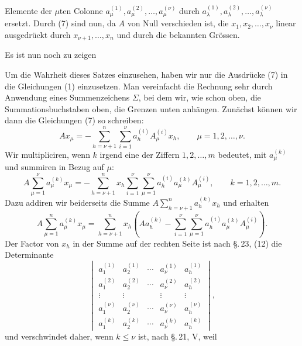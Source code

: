 
Elemente der $\mu$ten Colonne $a_\mu^{(1)},a_\mu^{(2)},\ldots,a_\mu^{(\nu)}$ durch $a_\lambda^{(1)},a_\lambda^{(2)},\ldots,a_\lambda^{(\nu)}$ ersetzt. Durch (7) sind nun, da $A$ von Null verschieden ist, die $x_1,x_2,\ldots,x_\nu$ linear ausgedrückt durch $x_{\nu+1},\ldots,x_n$ und durch die bekannten Grössen.

Es ist nun noch zu zeigen


Um die Wahrheit dieses Satzes einzusehen, haben wir nur die Ausdrücke (7) in die Gleichungen (1) einzusetzen. Man vereinfacht die Rechnung sehr durch Anwendung eines Summenzeichens \(\Sigma\), bei dem wir, wie schon oben, die Summationsbuchstaben oben, die Grenzen unten anhängen. Zunächst können wir dann die Gleichungen (7) so schreiben:
\begin{equation}
 A x_\mu=-\sum_{h=\nu+1}^{n}\sum_{i=1}^{\nu}a_h^{(i)}A_\mu^{(i)}x_h,
 \qquad \mu=1,2,\ldots,\nu.
\tag{9}
\end{equation}
Wir multipliciren, wenn $k$ irgend eine der Ziffern $1,2,\ldots,m$ bedeutet, mit $a_\mu^{(k)}$ und summiren in Bezug auf $\mu$:
\begin{equation}
 A\sum_{\mu=1}^{\nu}a_\mu^{(k)}x_\mu
 =-\sum_{h=\nu+1}^{n}x_h\sum_{i=1}^{\nu}\sum_{\mu=1}^{\nu}
 a_h^{(i)}a_\mu^{(k)}A_\mu^{(i)},
 \qquad k=1,2,\ldots,m.
\tag{10}
\end{equation}
Dazu addiren wir beiderseits die Summe $A\sum_{h=\nu+1}^{n}a_h^{(k)}x_h$ und erhalten
\begin{equation}
 A\sum_{\mu=1}^{n}a_\mu^{(k)}x_\mu
 =\sum_{h=\nu+1}^{n}x_h\left(Aa_h^{(k)}-
 \sum_{i=1}^{\nu}\sum_{\mu=1}^{\nu}a_h^{(i)}a_\mu^{(k)}A_\mu^{(i)}\right).
\tag{11}
\end{equation}
Der Factor von $x_h$ in der Summe auf der rechten Seite ist nach \S.\,23, (12) die Determinante
\begin{equation}
\begin{vmatrix}
 a_1^{(1)}&a_2^{(1)}&\cdots&a_\nu^{(1)}&a_h^{(1)}\\
 a_1^{(2)}&a_2^{(2)}&\cdots&a_\nu^{(2)}&a_h^{(2)}\\
 \vdots&\vdots&&\vdots&\vdots\\
 a_1^{(\nu)}&a_2^{(\nu)}&\cdots&a_\nu^{(\nu)}&a_h^{(\nu)}\\
 a_1^{(k)}&a_2^{(k)}&\cdots&a_\nu^{(k)}&a_h^{(k)}
\end{vmatrix},
\tag{12}
\end{equation}
und verschwindet daher, wenn $k\le\nu$ ist, nach \S.\,21, V, weil
